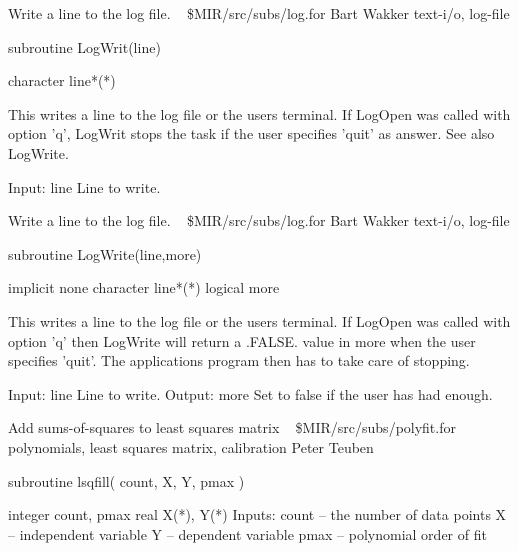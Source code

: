 %
\noindent Write a line to the log file.
\newline \ 
\newline {} \$MIR/src/subs/log.for
\newline {} Bart Wakker
\newline {} text-i/o, log-file
\par{\tenpoint
{\eightpoint\begintt
        subroutine LogWrit(line)

        character line*(*)

  This writes a line to the log file or the users terminal.
  If LogOpen was called with option 'q', LogWrit stops the
  task if the user specifies 'quit' as answer.
  See also LogWrite.

  Input:
    line       Line to write.
\endtt}
\par}
%
\noindent Write a line to the log file.
\newline \ 
\newline {} \$MIR/src/subs/log.for
\newline {} Bart Wakker
\newline \abox{Keywords:} text-i/o, log-file
\par{\tenpoint
{\eightpoint\begintt
        subroutine LogWrite(line,more)

        implicit none
        character line*(*)
        logical more

  This writes a line to the log file or the users terminal.
  If LogOpen was called with option 'q' then LogWrite will
  return a .FALSE. value in more when the user specifies 'quit'.
  The applications program then has to take care of stopping.

  Input:
    line       Line to write.
  Output:
    more       Set to false if the user has had enough.
\endtt}
\par}
%
\noindent Add sums-of-squares to least squares matrix
\newline \ 
\newline {} \$MIR/src/subs/polyfit.for
\newline \abox{Keywords:} polynomials, least squares matrix, calibration
\newline {} Peter Teuben
\par{\tenpoint
{\eightpoint\begintt
        subroutine lsqfill( count, X, Y, pmax )

        integer count, pmax
        real X(*), Y(*)
  Inputs:
       count -- the number of data points
       X     -- independent variable
       Y     -- dependent variable
       pmax  -- polynomial order of fit
\endtt}
\par}
